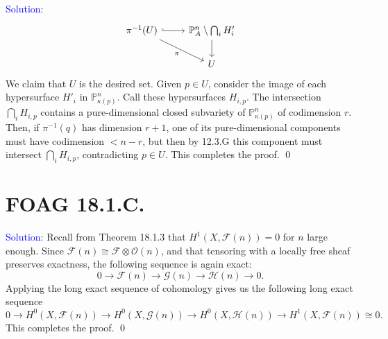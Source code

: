 \documentclass[11pt]{article}
\newcommand{\PP}{\mathbb{P}}
\newcommand{\cG}{\mathcal{G}}
\newcommand{\cF}{\mathcal{F}}
\newcommand{\cH}{\mathcal{H}}
\newcommand{\cO}{\mathcal{O}}
\newenvironment{solution}{\begin{trivlist}\item[]{\textcolor{blue}{Solution:}}}{\qed \end{trivlist}}
\begin{document}
\begin{solution}
    \[\begin{tikzcd}
        {\pi^{-1}(U)} & {\PP_A^n \setminus \bigcap_i H'_i} \\
        & U
        \arrow[hook, from=1-1, to=1-2]
        \arrow["\pi"', from=1-1, to=2-2]
        \arrow[from=1-2, to=2-2]
    \end{tikzcd}\] 
    We claim that $U$ is the desired set. Given $p \in U$, consider the image of each hypersurface $H'_i$ in $\PP_{\kappa(p)}^n$. Call these hypersurfaces $H_{i,p}$. The intersection $\bigcap_i H_{i,p}$ contains a pure-dimensional closed subvariety of $\PP_{\kappa(p)}^n$ of codimension $r$. Then, if $\pi^{-1}(q)$ has dimension $r+1$, one of its pure-dimensional components must have codimension $< n-r$, but then by 12.3.G this component must intersect $\bigcap_i H_{i,p}$, contradicting $p \in U$. This completes the proof. 
\end{solution}

\newpage

\section*{FOAG 18.1.C.}

\begin{solution}
    Recall from Theorem 18.1.3 that $H^1(X, \cF(n)) = 0$ for $n$ large enough. Since $\cF(n) \cong \cF \otimes \cO(n)$, and that tensoring with a locally free sheaf preserves exactness, the following sequence is again exact:
    \[
        0 \longrightarrow \cF(n) \longrightarrow \cG(n) \longrightarrow \cH(n) \longrightarrow 0.
    \]
    Applying the long exact sequence of cohomology gives us the following long exact sequence 
    \[
        0 \longrightarrow H^0(X, \cF(n)) \longrightarrow H^0(X, \cG(n)) \longrightarrow H^0(X, \cH(n)) \longrightarrow H^1(X, \cF(n)) \cong 0.
    \]
    This completes the proof. 
\end{solution}

\newpage
\end{document}
